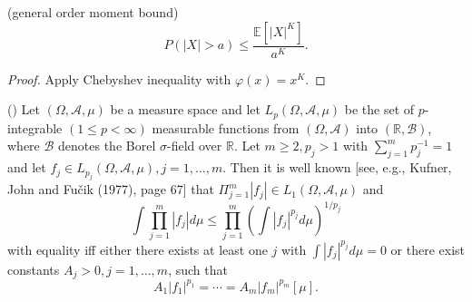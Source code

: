 \begin{proposition}
	(general order moment bound)
	\[
		P(|X| > a) \le \frac{\mathbb{E}\left[ |X|^K \right] }{a^K}
	.\] 
	\label{prop:moment-bound}
\end{proposition}
\begin{proof}
	Apply Chebyshev inequality with $\varphi(x) = x^K$.
\end{proof}


\begin{theorem}
	(\cite{finnerHolderInequality1992})
	Let $(\Omega, \mathscr{A}, \mu)$ be a measure space and let $L_p(\Omega, \mathscr{A}, \mu)$ be the set of $p$-integrable $(1 \leq p<\infty)$ measurable functions from $(\Omega, \mathscr{A})$ into $(\mathbb{R}, \mathscr{B})$, where $\mathscr{B}$ denotes the Borel $\sigma$-field over $\mathbb{R}$. Let $m \geq 2, p_j>1$ with $\sum_{j=1}^m p_j^{-1}=1$ and let $f_j \in L_{p_j}(\Omega, \mathscr{A}, \mu), j=1, \ldots, m$. Then it is well known [see, e.g., Kufner, John and Fučik (1977), page 67] that $\Pi_{j=1}^m\left|f_j\right| \in L_1(\Omega, \mathscr{A}, \mu)$ and
\[
\int \prod_{j=1}^m\left|f_j\right| d \mu \leq \prod_{j=1}^m\left(\int\left|f_j\right|^{p_j} d \mu\right)^{1 / p_j}
\]
with equality iff either there exists at least one $j$ with $\int\left|f_j\right|^{p_j} d \mu=0$ or there exist constants $A_j>0, j=1, \ldots, m$, such that
\[
A_1\left|f_1\right|^{p_1}=\cdots=A_m\left|f_m\right|^{p_m}[\mu] .
\]
\label{thm:general-holder}
\end{theorem}


